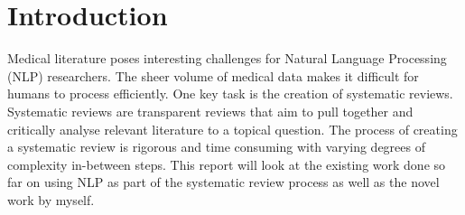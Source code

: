 \chapter{Introduction}

Medical literature poses interesting challenges for Natural Language Processing (NLP) researchers. The sheer volume of medical data makes it difficult for humans to process efficiently. One key task is the creation of systematic reviews. Systematic reviews are transparent reviews that aim to pull together and critically analyse relevant literature to a topical question. The process of creating a systematic review is rigorous and time consuming with varying degrees of complexity in-between steps. This report will look at the existing work done so far on using NLP as part of the systematic review process as well as the novel work by myself.





